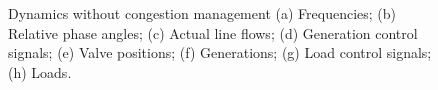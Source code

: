 \documentclass[journal,12pt,onecolumn,draftclsnofoot]{IEEEtran}
\begin{document}
\begin{figure}[]
{		%
		\label{fig:valveWOC}
}
	\caption{Dynamics without congestion management (a) Frequencies; (b) Relative phase angles; (c) Actual line flows; (d) Generation control signals; (e) Valve positions; (f) Generations; (g) Load control signals; (h) Loads.  }
	\label{fig:WOcongestion}
\end{figure}
\end{document}
